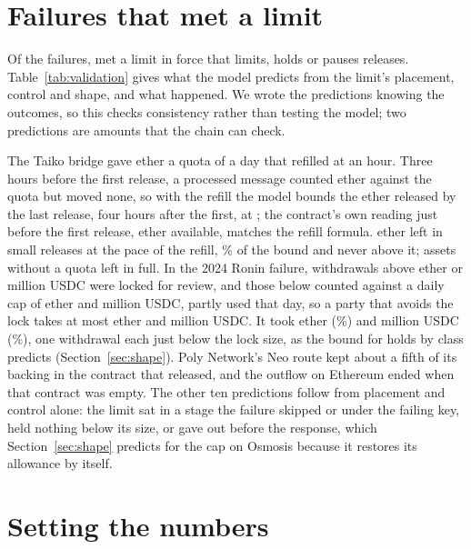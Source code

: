 \documentclass[conference,compsoc]{IEEEtran}
\numberwithin{equation}{section}
\theoremstyle{plain}
\theoremstyle{definition}
\theoremstyle{remark}
\begin{document}
\section{Failures that met a limit}\label{sec:validation}

Of the \nEvents{} failures, \nValidationWords{} met a limit in force that limits, holds or pauses releases. Table~\ref{tab:validation} gives what the model predicts from the limit's placement, control and shape, and what happened. We wrote the predictions knowing the outcomes, so this checks consistency rather than testing the model; two predictions are amounts that the chain can check.



The Taiko bridge gave ether a quota of \valTaikoQuota{} a day that refilled at \valTaikoRate{} an hour. Three hours before the first release, a processed message counted \valTaikoUsed{} ether against the quota but moved none, so with the refill the model bounds the ether released by the last release, four hours after the first, at \valTaikoBound{}; the contract's own reading just before the first release, \valTaikoRead{} ether available, matches the refill formula. \valTaikoOut{} ether left in small releases at the pace of the refill, \valTaikoPct\% of the bound and never above it; assets without a quota left in full. In the 2024 Ronin failure, withdrawals above \valRoninEthLock{} ether or \valRoninUsdcLockM{} million USDC were locked for review, and those below counted against a daily cap of \valRoninEthDaily{} ether and \valRoninUsdcDailyM{} million USDC, partly used that day, so a party that avoids the lock takes at most \valRoninEthBound{} ether and \valRoninUsdcBoundM{} million USDC. It took \valRoninEthOut{} ether (\valRoninEthPct\%) and \valRoninUsdcOutM{} million USDC (\valRoninUsdcPct\%), one withdrawal each just below the lock size, as the bound for holds by class predicts (Section~\ref{sec:shape}). Poly Network's Neo route kept about a fifth of its backing in the contract that released, and the outflow on Ethereum ended when that contract was empty. The other ten predictions follow from placement and control alone: the limit sat in a stage the failure skipped or under the failing key, held nothing below its size, or gave out before the response, which Section~\ref{sec:shape} predicts for the cap on Osmosis because it restores its allowance by itself.

\section{Setting the numbers}\label{sec:numbers}
\end{document}
